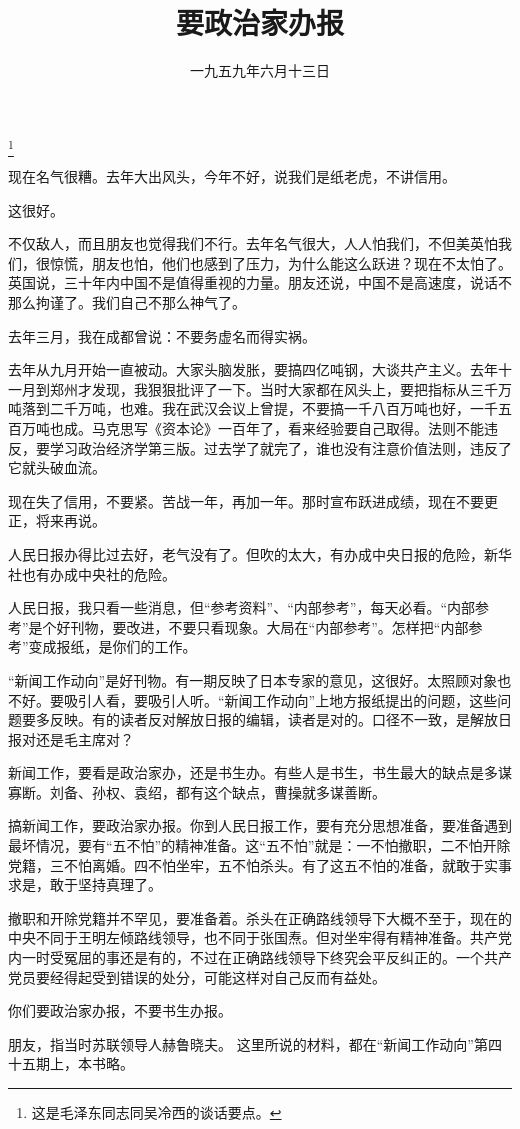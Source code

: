 
\title{要政治家办报}
\date{一九五九年六月十三日}
\thanks{这是毛泽东同志同吴冷西的谈话要点。}
\maketitle


现在名气很糟。去年大出风头，今年不好，说我们是纸老虎，不讲信用。

这很好。

不仅敌人，而且朋友也觉得我们不行。去年名气很大，人人怕我们，不但美英怕我们，很惊慌，朋友也怕，他们也感到了压力，为什么能这么跃进？现在不太怕了。英国说，三十年内中国不是值得重视的力量。朋友还说，中国不是高速度，说话不那么拘谨了。我们自己不那么神气了。

去年三月，我在成都曾说：不要务虚名而得实祸。

去年从九月开始一直被动。大家头脑发胀，要搞四亿吨钢，大谈共产主义。去年十一月到郑州才发现，我狠狠批评了一下。当时大家都在风头上，要把指标从三千万吨落到二千万吨，也难。我在武汉会议上曾提，不要搞一千八百万吨也好，一千五百万吨也成。马克思写《资本论》一百年了，看来经验要自己取得。法则不能违反，要学习政治经济学第三版。过去学了就完了，谁也没有注意价值法则，违反了它就头破血流。

现在失了信用，不要紧。苦战一年，再加一年。那时宣布跃进成绩，现在不要更正，将来再说。

人民日报办得比过去好，老气没有了。但吹的太大，有办成中央日报的危险，新华社也有办成中央社的危险。

人民日报，我只看一些消息，但“参考资料”、“内部参考”，每天必看。“内部参考”是个好刊物，要改进，不要只看现象。大局在“内部参考”。怎样把“内部参考”变成报纸，是你们的工作。

“新闻工作动向”是好刊物。有一期反映了日本专家的意见，这很好。太照顾对象也不好。要吸引人看，要吸引人听。“新闻工作动向”上地方报纸提出的问题，这些问题要多反映。有的读者反对解放日报的编辑，读者是对的。口径不一致，是解放日报对还是毛主席对？

新闻工作，要看是政治家办，还是书生办。有些人是书生，书生最大的缺点是多谋寡断。刘备、孙权、袁绍，都有这个缺点，曹操就多谋善断。

搞新闻工作，要政治家办报。你到人民日报工作，要有充分思想准备，要准备遇到最坏情况，要有“五不怕”的精神准备。这“五不怕”就是：一不怕撤职，二不怕开除党籍，三不怕离婚。四不怕坐牢，五不怕杀头。有了这五不怕的准备，就敢于实事求是，敢于坚持真理了。

撤职和开除党籍并不罕见，要准备着。杀头在正确路线领导下大概不至于，现在的中央不同于王明左倾路线领导，也不同于张国焘。但对坐牢得有精神准备。共产党内一时受冤屈的事还是有的，不过在正确路线领导下终究会平反纠正的。一个共产党员要经得起受到错误的处分，可能这样对自己反而有益处。

你们要政治家办报，不要书生办报。

\begin{maonote}
朋友，指当时苏联领导人赫鲁晓夫。
这里所说的材料，都在“新闻工作动向”第四十五期上，本书略。
\end{maonote}
